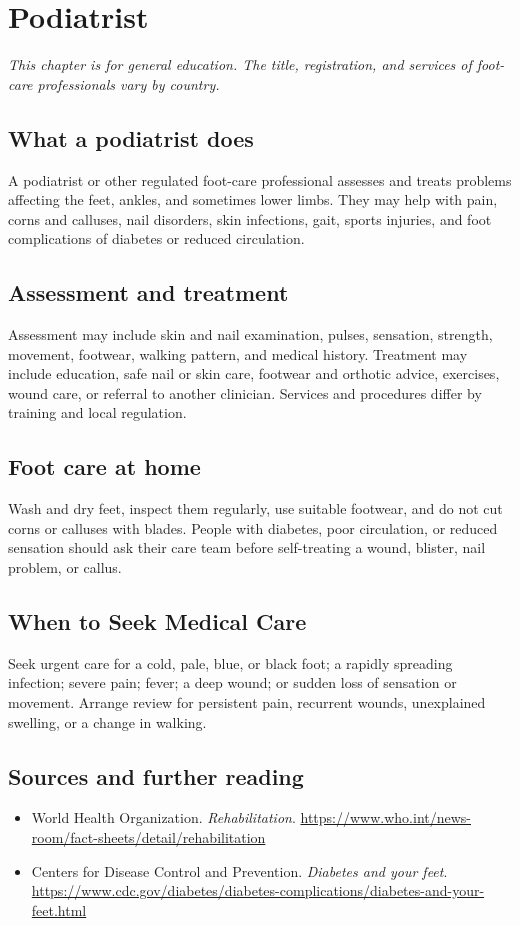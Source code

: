\chapter{Podiatrist}

\medskip
\noindent\textit{This chapter is for general education. The title, registration, and services of foot-care professionals vary by country.}

\section*{What a podiatrist does}
A podiatrist or other regulated foot-care professional assesses and treats problems affecting the feet, ankles, and sometimes lower limbs. They may help with pain, corns and calluses, nail disorders, skin infections, gait, sports injuries, and foot complications of diabetes or reduced circulation.

\section*{Assessment and treatment}
Assessment may include skin and nail examination, pulses, sensation, strength, movement, footwear, walking pattern, and medical history. Treatment may include education, safe nail or skin care, footwear and orthotic advice, exercises, wound care, or referral to another clinician. Services and procedures differ by training and local regulation.

\section*{Foot care at home}
Wash and dry feet, inspect them regularly, use suitable footwear, and do not cut corns or calluses with blades. People with diabetes, poor circulation, or reduced sensation should ask their care team before self-treating a wound, blister, nail problem, or callus.

\section*{When to Seek Medical Care}
Seek urgent care for a cold, pale, blue, or black foot; a rapidly spreading infection; severe pain; fever; a deep wound; or sudden loss of sensation or movement. Arrange review for persistent pain, recurrent wounds, unexplained swelling, or a change in walking.

\section*{Sources and further reading}
\begin{itemize}
\item World Health Organization. \textit{Rehabilitation}. \url{https://www.who.int/news-room/fact-sheets/detail/rehabilitation}
\item Centers for Disease Control and Prevention. \textit{Diabetes and your feet}. \url{https://www.cdc.gov/diabetes/diabetes-complications/diabetes-and-your-feet.html}
\end{itemize}
